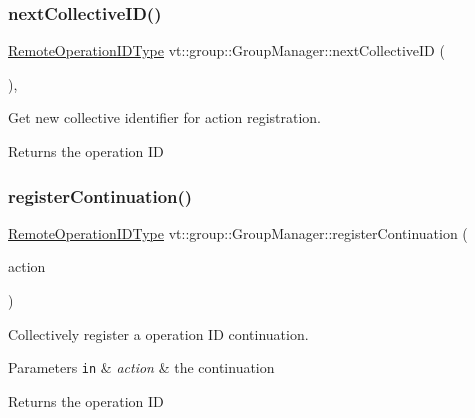 \subsubsection{\texorpdfstring{next\+Collective\+I\+D()}{nextCollectiveID()}}
{\footnotesize\ttfamily \hyperlink{namespacevt_1_1group_a73f2624ddeb535b39a08b6524f26b244}{Remote\+Operation\+I\+D\+Type} vt\+::group\+::\+Group\+Manager\+::next\+Collective\+ID (\begin{DoxyParamCaption}{ }\end{DoxyParamCaption})\hspace{0.3cm}{\ttfamily [inline]}, {\ttfamily [private]}}



Get new collective identifier for action registration. 

\begin{DoxyReturn}{Returns}
the operation ID 
\end{DoxyReturn}
\mbox{\label{structvt_1_1group_1_1_group_manager_aebb439bebdefc27cfa6408e5cf0f7741}} 
\subsubsection{\texorpdfstring{register\+Continuation()}{registerContinuation()}\hspace{0.1cm}{\footnotesize\ttfamily [1/2]}}
{\footnotesize\ttfamily \hyperlink{namespacevt_1_1group_a73f2624ddeb535b39a08b6524f26b244}{Remote\+Operation\+I\+D\+Type} vt\+::group\+::\+Group\+Manager\+::register\+Continuation (\begin{DoxyParamCaption}\item[{\hyperlink{namespacevt_ae0a5a7b18cc99d7b732cb4d44f46b0f3}{Action\+Type}}]{action }\end{DoxyParamCaption})\hspace{0.3cm}{\ttfamily [private]}}



Collectively register a operation ID continuation. 


\begin{DoxyParams}[1]{Parameters}
\mbox{\tt in}  & {\em action} & the continuation\\
\hline
\end{DoxyParams}
\begin{DoxyReturn}{Returns}
the operation ID 
\end{DoxyReturn}
\mbox{\label{structvt_1_1group_1_1_group_manager_a7ce9aaa7a143c8c919ac68c866917dd2}} 
